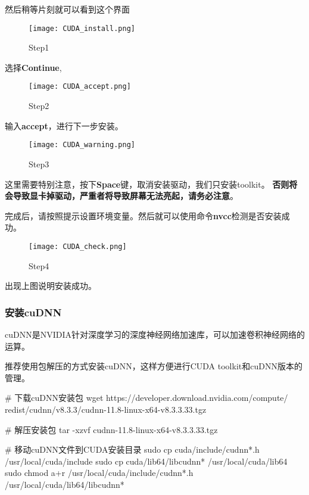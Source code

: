 然后稍等片刻就可以看到这个界面

\begin{figure}[H]
    \centering
    \texttt{[image: CUDA\_install.png]}
    \caption{Step1} %
    \label{fig:CUDA_install} %
\end{figure}

选择\textbf{Continue},

\begin{figure}[H]
    \centering
    \texttt{[image: CUDA\_accept.png]}
    \caption{Step2} %
    \label{fig:CUDA_install} %
\end{figure}

输入\textbf{accept}，进行下一步安装。

\begin{figure}[H]
    \centering
    \texttt{[image: CUDA\_warning.png]}
    \caption{Step3} %
    \label{fig:CUDA_install} %
\end{figure}

这里需要特别注意，按下\textbf{Space}键，取消安装驱动，我们只安装toolkit。
\textbf{否则将会导致显卡掉驱动，严重者将导致屏幕无法亮起，请务必注意}。

完成后，请按照提示设置环境变量。然后就可以使用命令\textbf{nvcc}检测是否安装成功。

\begin{figure}[H]
    \centering
    \texttt{[image: CUDA\_check.png]}
    \caption{Step4} %
    \label{fig:CUDA_install} %
\end{figure}

出现上图说明安装成功。

\subsubsection{安装cuDNN}

cuDNN是NVIDIA针对深度学习的深度神经网络加速库，可以加速卷积神经网络的运算。

推荐使用包解压的方式安装cuDNN，这样方便进行CUDA toolkit和cuDNN版本的管理。

\begin{tbash}
# 下载cuDNN安装包
wget https://developer.download.nvidia.com/compute/
redist/cudnn/v8.3.3/cudnn-11.8-linux-x64-v8.3.3.33.tgz

# 解压安装包
tar -xzvf cudnn-11.8-linux-x64-v8.3.3.33.tgz

# 移动cuDNN文件到CUDA安装目录
sudo cp cuda/include/cudnn*.h /usr/local/cuda/include
sudo cp cuda/lib64/libcudnn* /usr/local/cuda/lib64
sudo chmod a+r /usr/local/cuda/include/cudnn*.h /usr/local/cuda/lib64/libcudnn*
\end{tbash}

